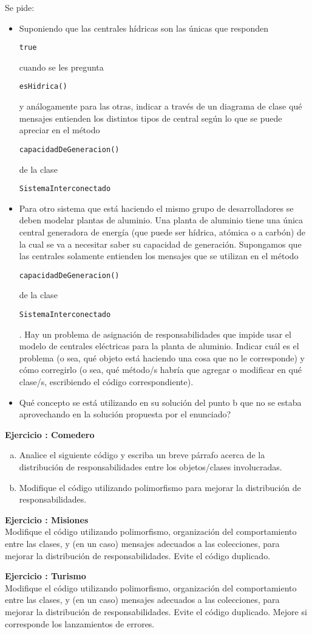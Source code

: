 \documentclass[a4paper,12pt]{article}
\newcounter{ej}
\newcounter{prte}
\newcommand{\ejercicio}[1]{\stepcounter{ej} \setcounter{prte}{0} \par \textbf{ Ejercicio \arabic{ej}: #1} \\ }
\newcommand{\code}[1]{\begin{small}\texttt{#1}\end{small}}
\begin{document}
Se pide:
\begin{itemize}
\item Suponiendo que las centrales hídricas son las únicas que responden \code{true} cuando se les pregunta \code{esHidrica()} y análogamente para las otras, indicar a través de un diagrama de clase qué mensajes entienden los distintos tipos de central según lo que se puede apreciar en el método \code{capacidadDeGeneracion()} de la clase \code{SistemaInterconectado}
\item Para otro sistema que está haciendo el mismo grupo de desarrolladores se deben modelar plantas de aluminio. Una planta de aluminio tiene una única central generadora de energía (que puede ser hídrica, atómica o a carbón) de la cual se va a necesitar saber su capacidad de generación. Supongamos que las centrales solamente entienden los mensajes que se utilizan en el método \code{capacidadDeGeneracion()} de la clase \code{SistemaInterconectado}.
Hay un problema de asignación de responsabilidades que impide usar el modelo de centrales eléctricas para la planta de aluminio. Indicar cuál es el problema (o sea, qué objeto está haciendo una cosa que no le corresponde) y cómo corregirlo (o sea, qué método/s habría que agregar o modificar en qué clase/s, escribiendo el código correspondiente).
\item Qué concepto se está utilizando en su solución del punto b que no se estaba aprovechando en la solución propuesta por el enunciado?
\end{itemize}
\newpage
\ejercicio{Comedero}
\begin{enumerate}[a)]
\item Analice el siguiente código y escriba un breve párrafo acerca de la distribución de responsabilidades entre los objetos/clases involucradas. 
\item Modifique el código utilizando polimorfismo para mejorar la distribución de responsabilidades.
\end{enumerate}



\ejercicio{Misiones}
Modifique el código utilizando polimorfismo, organización del comportamiento entre las clases, y (en un caso) mensajes adecuados a las colecciones, para mejorar la distribución de responsabilidades. Evite el código duplicado.



\ejercicio{Turismo}
Modifique el código utilizando polimorfismo, organización del comportamiento entre las clases, y (en un caso) mensajes adecuados a las colecciones, para mejorar la distribución de responsabilidades. Evite el código duplicado.
Mejore si corresponde los lanzamientos de errores.


\end{document}
